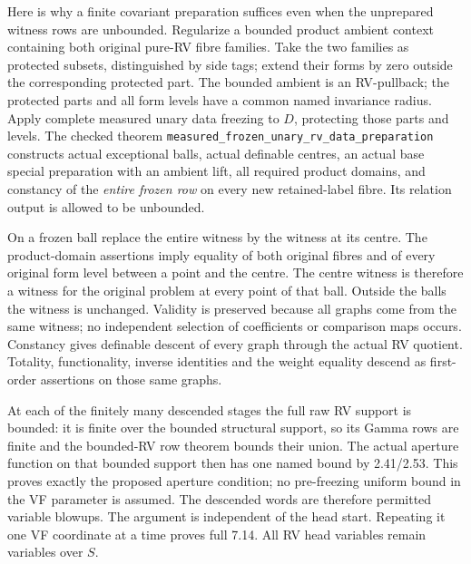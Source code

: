 Here is why a finite covariant preparation suffices even when the
unprepared witness rows are unbounded. Regularize a bounded product
ambient context containing both original pure-RV fibre families. Take
the two families as protected subsets, distinguished by side tags;
extend their forms by zero outside the corresponding protected part.
The bounded ambient is an RV-pullback; the protected parts and all form
levels have a common named invariance radius. Apply complete measured
unary data freezing to $D$, protecting those parts and levels. The
checked theorem \texttt{measured\_frozen\_unary\_rv\_data\_preparation}
constructs actual exceptional balls, actual definable centres, an actual
base special preparation with an ambient lift, all required product
domains, and constancy of the \emph{entire frozen row} on every new
retained-label fibre. Its relation output is allowed to be unbounded.

On a frozen ball replace the entire witness by the witness at its
centre. The product-domain assertions imply equality of both original
fibres and of every original form level between a point and the centre.
The centre witness is therefore a witness for the original problem
at every point of that ball. Outside the balls the witness is unchanged.
Validity is preserved because all graphs come from the same witness;
no independent selection of coefficients or comparison maps occurs.
Constancy gives definable descent of every graph through the actual
RV quotient. Totality, functionality, inverse identities and the
weight equality descend as first-order assertions on those same graphs.

At each of the finitely many descended stages the full raw RV support
is bounded: it is finite over the bounded structural support, so its
Gamma rows are finite and the bounded-RV row theorem bounds their union.
The actual aperture function on that bounded support then has one named
bound by 2.41/2.53. This proves exactly the proposed aperture condition;
no pre-freezing uniform bound in the VF parameter is assumed. The
descended words are therefore permitted variable blowups. The argument
is independent of the head start. Repeating it one VF coordinate at a
time proves full 7.14. All RV head variables remain variables over $S$.

